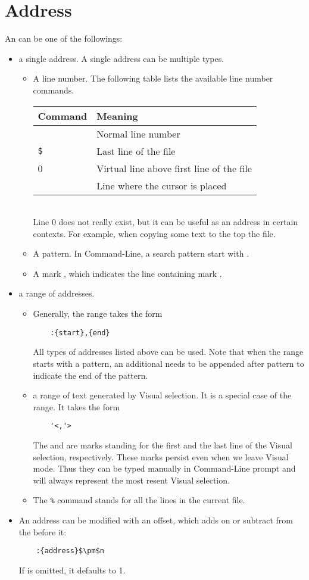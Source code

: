 \documentclass{article}
\newcommand{\syntax}[1]{\PVerb{#1}}
\begin{document}
\section{Address}
An \syntax{{address}} can be one of the followings:
\begin{itemize}
  \item a single address. A single address can be multiple types.
    \begin{itemize}
      \item A line number. The following table lists the available line number commands.\\
	\begin{tabular}[hbtp]{ll}
	  \hline
	  Command&Meaning\\
	  \hline
	  \syntax{<number>}&Normal line number\\
	  \verb|$|&Last line of the file\\
	  0&Virtual line above first line of the file\\
	  \syntax{.}&Line where the cursor is placed\\
	  \hline
	\end{tabular}\\
	Line 0 does not really exist, but it can be useful as an address in certain contexts. For example, when copying some text to the top the file.
      \item A pattern. In Command-Line, a search pattern start with \syntax{/}.
      \item A mark \syntax{'m}, which indicates the line containing mark \syntax{m}.
    \end{itemize}
  \item a range of addresses.
    \begin{itemize}
      \item Generally, the range takes the form
	\begin{lstlisting}
	:{start},{end}
	\end{lstlisting}
	All types of addresses listed above can be used. Note that when the range starts with a pattern, an additional \syntax{/} needs to be appended after pattern to indicate the end of the pattern.
      \item a range of text generated by Visual selection. It is a special case of the range. It takes the form 
	\begin{lstlisting}
	'<,'>
	\end{lstlisting}
	The \syntax{'<} and \syntax{'>} are marks standing for the first and the last line of the Visual selection, respectively.
	These marks persist even when we leave Visual mode. Thus they can be typed manually in Command-Line prompt and will always represent the most resent Visual selection.
      \item The \verb|%| command stands for all the lines in the current file.
    \end{itemize}
  \item An address can be modified with an offset, which adds on or subtract from the \syntax{{address}} before it:
    \begin{lstlisting}
    :{address}$\pm$n
    \end{lstlisting}
    If \syntax{n} is omitted, it defaults to 1.
\end{itemize}
\end{document}
